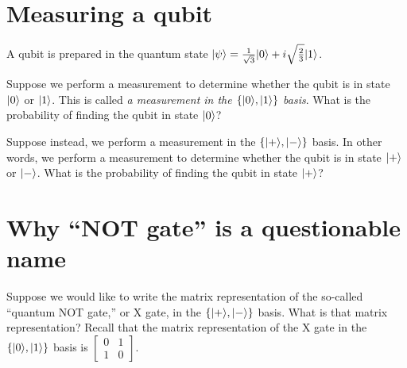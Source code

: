 \documentclass{../phys084}
\begin{document}
\begin{solution}
\end{solution}

\section{Measuring a qubit}

\begin{exercise}
  A qubit is prepared in the quantum state
  \(\lvert\psi\rangle = \frac{1}{\sqrt 3} \lvert0\rangle + i \sqrt{\frac 2 3} \lvert1\rangle\).
  \begin{problems}
  \item Suppose we perform a measurement to determine whether the
    qubit is in state \(\lvert0\rangle\) or \(\lvert1\rangle\).  This is called
    \textit{a measurement in the \(\{\lvert0\rangle, \lvert1\rangle\}\) basis}.
    What is the probability of finding the qubit in state \(\lvert0\rangle\)?
  \item Suppose instead, we perform a measurement in the
    \(\{\lvert+\rangle, \lvert-\rangle\}\) basis.  In other words, we perform a
    measurement to determine whether the qubit is in state \(\lvert+\rangle\)
    or \(\lvert-\rangle\).  What is the probability of finding the qubit in
    state \(\lvert+\rangle\)?
  \end{problems}
\end{exercise}

\begin{solution}
\end{solution}

\section{Why ``NOT gate'' is a questionable name}
\begin{exercise}
  Suppose we would like to write the matrix representation of the
  so-called ``quantum NOT gate,'' or X gate, in the
  \(\{\lvert+\rangle, \lvert-\rangle\}\) basis.  What is that matrix representation?
  Recall that the matrix representation of the X gate in the
  \(\{\lvert0\rangle, \lvert1\rangle\}\) basis is
  \(\begin{bmatrix} 0 & 1 \\ 1 & 0 \end{bmatrix}\).
\end{exercise}

\begin{solution}
\end{solution}
\end{document}
